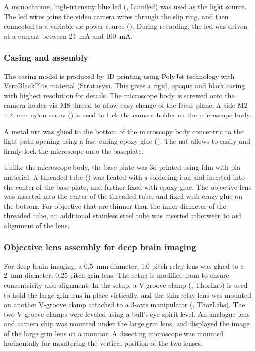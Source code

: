 A monochrome, high-intensity blue \gls{led} (, Lumiled) was used as the light source. The \gls{led} wires joins the video camera wires through the slip ring, and then connected to a variable \gls{dc} power source (). During recording, the \gls{led} was driven at a current between \SI{20}{\mA} and \SI{100}{\mA}.

\subsubsection{Casing and assembly}
The casing model is produced by 3D printing using PolyJet technology with VeroBlackPlus material (Stratasys). This gives a rigid, opaque and black casing with highest resolution for details. The microscope body is screwed onto the camera holder via M8 thread to allow easy change of the focus plane. A side M2$\times$\SI{2}{\mm} nylon screw () is used to lock the camera holder on the microscope body.

A metal nut  was glued to the bottom of the microscopy body concentric to the light path opening using a fast-curing epoxy glue (). The nut allows to easily and firmly lock the microscope onto the baseplate.

Unlike the microscope body, the base plate was 3d printed using \gls{fdm} with \gls{pla} material. A threaded tube () was heated with a soldering iron and inserted into the center of the base plate, and further fixed with epoxy glue. The objective lens was inserted into the center of the threaded tube, and fixed with crazy glue on the bottom. For objective that are thinner than the inner diameter of the threaded tube, an additional stainless steel tube was inserted inbetween to aid alignment of the lens.

\subsubsection{Objective lens assembly for deep brain imaging} \label{objective assembly}

For deep brain imaging, a \SI{0.5}{\mm} diameter, 1.0-pitch relay lens was glued to a \SI{2}{\mm} diameter, 0.25-pitch \gls{grin} lens. The setup is modified from \citep{kim12} to ensure concentricity and alignment. In the setup, a V-groove clamp (, ThorLab) is used to hold the large \gls{grin} lens in place virtically, and the thin relay lens was mounted on another V-groove clamp attached to a 3-axis manipulator (, ThorLabs). The two V-groove clamps were leveled using a bull's eye spirit level. An analogue lens and camera chip was mounted under the large \gls{grin} lens, and displayed the image of the large \gls{grin} lens on a monitor. A disecting microscope was mounted horizontally for monitoring the vertical position of the two lenses. 

